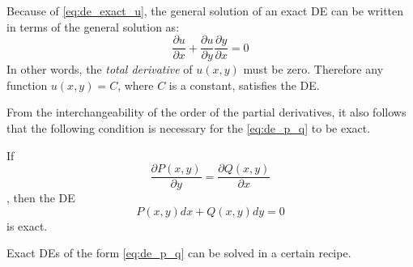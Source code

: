 \documentclass[a4paper]{article}
\begin{document}
\begin{corollary}
Because of \eqref{eq:de_exact_u}, the general solution of an exact DE can be written in terms of the general solution as:
    \[
    \frac{\partial u}{\partial x}  + \frac{\partial u}{\partial y}  \frac{\partial y}{\partial x} = 0
    \]
    In other words, the \textit{total derivative} of $u(x,y)$ must be zero. Therefore any function $u(x,y) = C$, where $C$ is a constant, satisfies the DE.
\end{corollary}
From the interchangeability of the order of the partial derivatives, it also follows that the following condition is necessary for the \eqref{eq:de_p_q} to be exact.
\begin{corollary}
If 
\begin{equation}
    \frac{\partial P(x,y)}{\partial y}  = \frac{\partial Q(x,y)}{\partial x}
\end{equation}
, then the DE 
\begin{equation}
    P(x,y)dx + Q(x,y)dy = 0
    \label{eq:condition_exactness}
\end{equation}
is exact.
\end{corollary}
Exact DEs of the form \eqref{eq:de_p_q} can be solved in a certain recipe.
\end{document}

